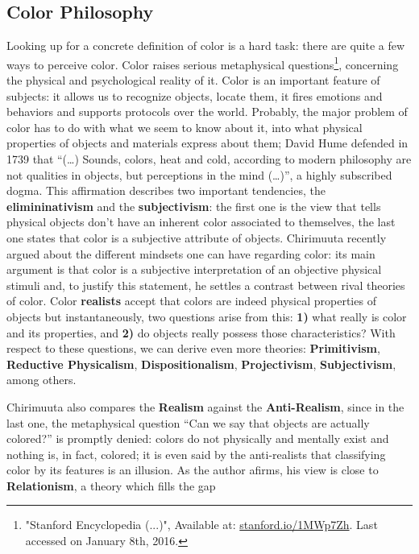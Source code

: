 \documentclass{report}
\begin{document}
\subsection{Color Philosophy}
\label{sec:colorphilosophy}
Looking up for a concrete definition of color is a hard task: there are quite a few ways to perceive color. Color
raises serious metaphysical questions\footnote{"Stanford Encyclopedia (...)", Available at: \url{stanford.io/1MWp7Zh}. Last accessed on January 8th, 2016.}, 
concerning the physical and psychological reality of it. Color is an
important feature of subjects: it allows us to recognize objects, locate them, it fires emotions and
behaviors and supports protocols over the world. Probably, the major problem of color has to do with what
we seem to know about it, into what physical properties of objects and materials express about them; David
Hume defended in 1739 \cite{Hume1739} that “(…) Sounds, colors, heat and cold, according to modern philosophy are not
qualities in objects, but perceptions in the mind (…)”, a highly subscribed dogma. This affirmation describes
two important tendencies, the \textbf{elimininativism} and the \textbf{subjectivism}: the first one is the
view that tells physical objects don’t have an inherent color associated to themselves, the last one states
that color is a subjective attribute of objects. Chirimuuta recently argued \cite{Chirimuuta2014} about the different
mindsets one can have regarding color: its main argument is that color is a subjective interpretation of
an objective physical stimuli and, to justify this statement, he settles a contrast between rival theories 
of color. Color \textbf{realists} accept that colors are indeed physical properties of objects but instantaneously,
two questions arise from this: \textbf{1)} what really is color and its properties, and \textbf{2)} do objects really possess
those characteristics? With respect to these questions, we can derive even more theories: \textbf{Primitivism}, \textbf{Reductive Physicalism}, \textbf{Dispositionalism}, \textbf{Projectivism}, \textbf{Subjectivism}, among others. \par
%
Chirimuuta \cite{Chirimuuta2014} also compares the \textbf{Realism} against the \textbf{Anti-Realism}, since in the last one, the metaphysical question
“Can we say that objects are actually colored?” is promptly denied: colors do not physically and mentally
exist and nothing is, in fact, colored; it is even said by the anti-realists that classifying color by its features is an  illusion. As the author afirms, his view is close to \textbf{Relationism}, a theory which fills the gap
\end{document}
